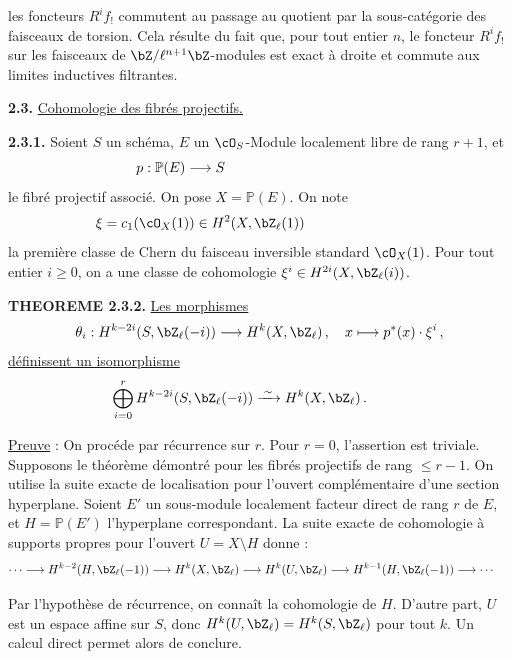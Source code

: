 les foncteurs $R^i f_!$ commutent au passage au quotient par la sous-cat\'egorie des faisceaux de torsion. Cela r\'esulte du fait que, pour tout entier $n$, le foncteur $R^i f_!$ sur les faisceaux de $\bZ/\ell^{n+1}\bZ$-modules est exact \`a droite et commute aux limites inductives filtrantes.

\bigskip

\noindent
\textbf{2.3.} \underline{Cohomologie des fibr\'es projectifs.}

\noindent
\textbf{2.3.1.} Soient $S$ un sch\'ema, $E$ un $\cO_S$-Module localement libre de rang $r+1$, et
\[
p : \mathbb{P}(E) \longrightarrow S\hspace*{4cm}
\]
le fibr\'e projectif associ\'e. On pose $X = \mathbb{P}(E)$. On note
\[
\xi = c_1(\cO_X(1)) \in H^2(X, \bZ_{\ell}(1))\hspace*{3cm}
\]
la premi\`ere classe de Chern du faisceau inversible standard $\cO_X(1)$. Pour tout entier $i \geq 0$, on a une classe de cohomologie $\xi^i \in H^{2i}(X, \bZ_{\ell}(i))$.

\smallskip

\noindent
\textbf{THEOREME 2.3.2.} \underline{Les morphismes}
\[
\theta_i : H^{k-2i}(S, \bZ_{\ell}(-i)) \longrightarrow H^k(X, \bZ_{\ell})\,, \quad x \longmapsto p^*(x) \cdot \xi^i\,,
\]
\underline{d\'efinissent un isomorphisme}
\[
\bigoplus_{i=0}^{r} H^{k-2i}(S, \bZ_{\ell}(-i)) \xrightarrow{\;\sim\;} H^k(X, \bZ_{\ell})\,.\hspace*{1cm}
\]

\smallskip

\noindent
\underline{Preuve} : On proc\'ede par r\'ecurrence sur $r$. Pour $r = 0$, l'assertion est triviale. Supposons le th\'eor\`eme d\'emontr\'e pour les fibr\'es projectifs de rang $\leq r-1$. On utilise la suite exacte de localisation pour l'ouvert compl\'ementaire d'une section hyperplane. Soient $E'$ un sous-module localement facteur direct de rang $r$ de $E$, et $H = \mathbb{P}(E')$ l'hyperplane correspondant. La suite exacte de cohomologie \`a supports propres pour l'ouvert $U = X \setminus H$ donne :
\[
\cdots \longrightarrow H^{k-2}(H, \bZ_{\ell}(-1)) \longrightarrow H^k(X, \bZ_{\ell}) \longrightarrow H^k(U, \bZ_{\ell}) \longrightarrow H^{k-1}(H, \bZ_{\ell}(-1)) \longrightarrow \cdots\hspace*{0.5cm}
\]

Par l'hypoth\`ese de r\'ecurrence, on conna\^it la cohomologie de $H$. D'autre part, $U$ est un espace affine sur $S$, donc $H^k(U, \bZ_{\ell}) = H^k(S, \bZ_{\ell})$ pour tout $k$. Un calcul direct permet alors de conclure.

